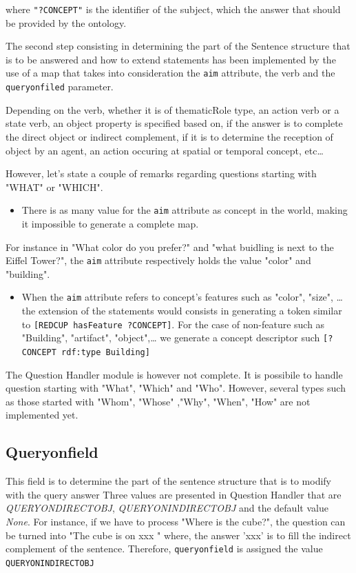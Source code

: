 \documentclass[twoside,a4paper,10pt]{report}
\newcommand{\dokutitlelevelfour}[1]{\subsection{#1}}
\newcommand{\dokuitalic}[1]{\textsl{#1}}
\newcommand{\dokumonospace}[1]{\texttt{#1}}
\newcommand{\dokuitem}{\item}
\begin{document}
where \dokumonospace{"?CONCEPT"} is the identifier of the subject, which the answer that should be provided by the ontology.


The second step consisting in determining the part of the Sentence structure that is to be answered and how to extend statements has been implemented by the use of a map that takes into consideration the \dokumonospace{aim} attribute, the verb and the \dokumonospace{query{\textunderscore}on{\textunderscore}filed} parameter.

Depending on the verb, whether it is of thematicRole type, an action verb or a state verb, an object property is specified based on, if the answer is to complete the direct object or indirect complement, if it is to determine the reception of object by an agent, an action occuring at spatial or temporal concept, etc\ldots{}

However, let's state a couple of remarks regarding questions starting with "WHAT" or "WHICH".


\begin{itemize}
\dokuitem  There is as many value for the \dokumonospace{aim} attribute as concept in the world, making it impossible to generate a complete map.
\end{itemize}
 For instance in "What color do you prefer?" and "what buidling is next to the Eiffel Tower?", the \dokumonospace{aim} attribute respectively holds the value "color" and  "building".



\begin{itemize}
\dokuitem  When the \dokumonospace{aim} attribute refers to concept's features such as "color", "size", \ldots{}  the extension of the statements would consists in generating a token similar to \dokumonospace{[RED{\textunderscore}CUP hasFeature ?CONCEPT]}. For the case of non-feature such as "Building", "artifact", "object",\ldots{} we generate a concept descriptor such \dokumonospace{[?CONCEPT rdf:type Building]}
\end{itemize}
The Question Handler module is however not complete. It is possibile to handle question starting with "What", "Which" and "Who". However,  several types such as those started with "Whom", "Whose" ,"Why", "When", "How" are not implemented yet.


\dokutitlelevelfour{Query{\textunderscore}on{\textunderscore}field}

This field is to determine the part of the sentence structure that is to modify with the query answer
Three values are presented in Question Handler that are \dokuitalic{QUERY{\textunderscore}ON{\textunderscore}DIRECT{\textunderscore}OBJ}, \dokuitalic{QUERY{\textunderscore}ON{\textunderscore}INDIRECT{\textunderscore}OBJ} and the default value \dokuitalic{None}.
For instance, if we have to process "Where is the cube?", the question can be turned into "The cube is on xxx " where, the answer 'xxx' is to fill the indirect complement of the sentence. 
Therefore, \dokumonospace{query{\textunderscore}on{\textunderscore}field} is assigned the value \dokumonospace{QUERY{\textunderscore}ON{\textunderscore}INDIRECT{\textunderscore}OBJ}
\end{document}
